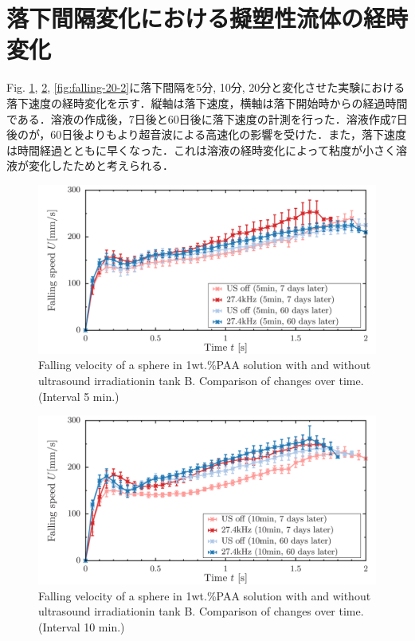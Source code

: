 \section{落下間隔変化における擬塑性流体の経時変化}

Fig. \ref{fig:falling-5-2}, \ref{fig:falling-10-2}, \ref{fig:falling-20-2}に落下間隔を5分, 10分, 20分と変化させた実験における落下速度の経時変化を示す．縦軸は落下速度，横軸は落下開始時からの経過時間である．溶液の作成後，7日後と60日後に落下速度の計測を行った．溶液作成7日後のが，60日後よりもより超音波による高速化の影響を受けた．また，落下速度は時間経過とともに早くなった．これは溶液の経時変化によって粘度が小さく溶液が変化したためと考えられる．

\begin{figure}[ht]
    \centering
    \includegraphics[width=12cm,clip]{X-Appendix/5.png}
    \caption{Falling velocity of a sphere in 1wt.\%PAA solution with and without ultrasound irradiationin tank B. Comparison of changes over time. (Interval 5 min.)}
    \label{fig:falling-5-2}
\end{figure}
\begin{figure}[ht]
    \centering
    \includegraphics[width=12cm,clip]{X-Appendix/10.png}
    \caption{Falling velocity of a sphere in 1wt.\%PAA solution with and without ultrasound irradiationin tank B. Comparison of changes over time. (Interval 10 min.)}
    \label{fig:falling-10-2}
\end{figure}

